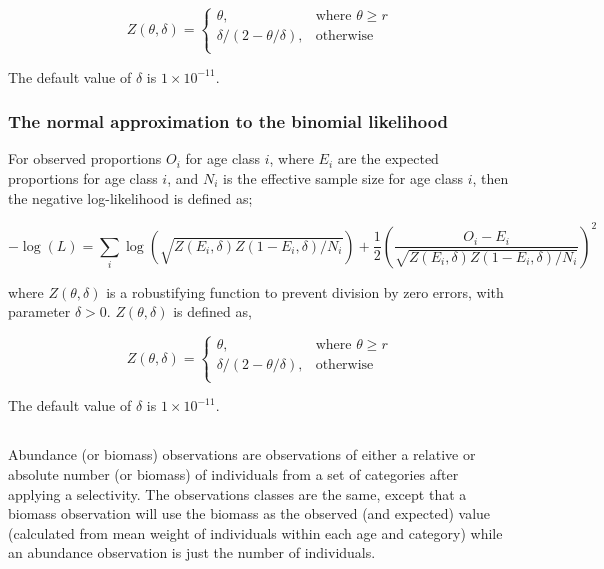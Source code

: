 {{\begin{equation}
   Z \left(\theta,\delta \right) = \begin{cases}
	  \theta, & \text{where $\theta \ge r$} \\
	  \delta/\left( 2-\theta/\delta \right), & \text{otherwise} \\  
  \end{cases}
\end{equation}

The default value of $\delta$ is $1 \times 10^{-11}$.

\subsubsection*{The normal approximation to the binomial likelihood}

For observed proportions $O_i$ for age class $i$, where $E_i$ are the expected proportions for age class $i$, and $N_i$ is the effective sample size for age class $i$, then the negative log-likelihood is defined as;  

\begin{equation}
  -\log \left(L \right)= \sum\limits_i \log \left( \sqrt{Z\left(E_i,\delta \right)Z\left(1-E_i,\delta\right)/N_i} \right)     + \frac{1}{2} \left( \frac{O_i-E_i}{\sqrt{Z\left(E_i,\delta\right)Z\left(1-E_i,\delta \right)/N_i}} \right)^2
\end{equation}

where $Z \left(\theta,\delta \right)$ is a robustifying function to prevent division by zero errors, with parameter $\delta>0$. $Z \left(\theta,\delta \right)$ is defined as,

\begin{equation}
   Z \left(\theta,\delta \right) = \begin{cases}
	  \theta, & \text{where $\theta \ge r$} \\
	  \delta/\left( 2-\theta/\delta \right), & \text{otherwise} \\  
  \end{cases}
\end{equation}

The default value of $\delta$ is $1 \times 10^{-11}$.

\subsection{}

Abundance (or biomass) observations are observations of either a relative or absolute number (or biomass) of individuals from a set of categories after applying a selectivity. The observations classes are the same, except that a biomass observation will use the biomass as the observed (and expected) value (calculated from mean weight of individuals within each age and category) while an abundance observation is just the number of individuals. 

}}
